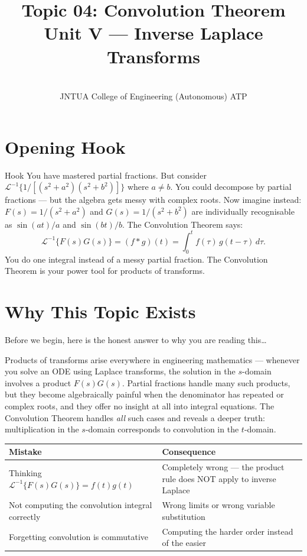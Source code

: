 \documentclass[12pt,a4paper]{article}
\title{Topic 04: Convolution Theorem \\ \large Unit V --- Inverse Laplace Transforms}
\author{\\
        JNTUA College of Engineering (Autonomous) ATP}
\date{}
\begin{document}
\maketitle
\tableofcontents
\newpage

\section{Opening Hook}

\begin{curiositybox}{Hook}
You have mastered partial fractions. But consider
$\mathcal{L}^{-1}\{1/[(s^2+a^2)(s^2+b^2)]\}$ where $a \neq b$.
You could decompose by partial fractions --- but the algebra gets messy with
complex roots. Now imagine instead: $F(s) = 1/(s^2+a^2)$ and
$G(s) = 1/(s^2+b^2)$ are individually recognisable as $\sin(at)/a$ and
$\sin(bt)/b$. The Convolution Theorem says:
\[
  \mathcal{L}^{-1}\{F(s)G(s)\}
    = (f * g)(t)
    = \int_0^t f(\tau)\,g(t-\tau)\,d\tau.
\]
You do one integral instead of a messy partial fraction.
The Convolution Theorem is your power tool for products of transforms.
\end{curiositybox}

\section{Why This Topic Exists}

Before we begin, here is the honest answer to why you are reading this\ldots

Products of transforms arise everywhere in engineering mathematics --- whenever
you solve an ODE using Laplace transforms, the solution in the $s$-domain
involves a product $F(s)G(s)$. Partial fractions handle many such products, but
they become algebraically painful when the denominator has repeated or complex
roots, and they offer no insight at all into integral equations. The Convolution
Theorem handles \emph{all} such cases and reveals a deeper truth: multiplication
in the $s$-domain corresponds to convolution in the $t$-domain.

\medskip
\begin{center}
\begin{tabular}{@{}ll@{}}
\toprule
\textbf{Mistake} & \textbf{Consequence} \\
\midrule
Thinking $\mathcal{L}^{-1}\{F(s)G(s)\} = f(t)g(t)$ &
  Completely wrong --- the product rule does NOT apply to inverse Laplace \\
Not computing the convolution integral correctly &
  Wrong limits or wrong variable substitution \\
Forgetting convolution is commutative &
  Computing the harder order instead of the easier \\
\bottomrule
\end{tabular}
\end{center}
\end{document}
